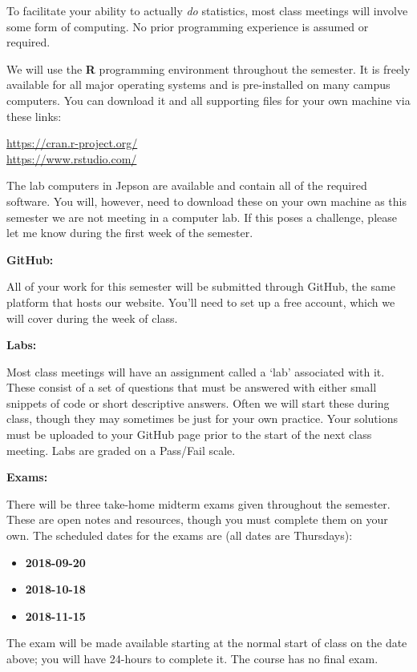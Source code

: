 \documentclass[12pt]{article}
\begin{document}
To facilitate your ability to actually \textit{do} statistics,
most class meetings will involve some form of computing.
No prior programming experience is assumed or required.

\medskip

We will use the \textbf{R} programming environment throughout the
semester. It is freely available for all major operating systems and
is pre-installed on many campus computers. You can download it and
all supporting files for your own machine via these links:
\begin{center}
\url{https://cran.r-project.org/} \\
\url{https://www.rstudio.com/}
\end{center}
The lab computers in Jepson are available and contain all of the
required software. You will, however, need to download these on your own
machine as this semester we are not meeting in a computer lab. If this poses
a challenge, please let me know during the first week of the semester.

\bigskip

\textbf{GitHub:} \vspace{6pt}

All of your work for this semester will be submitted through GitHub,
the same platform that hosts our website. You'll need to set up a free
account, which we will cover during the week of class.

\bigskip

\textbf{Labs:} \vspace{6pt}

Most class meetings will have an assignment called a `lab' associated with it.
These consist of a set of questions that must be answered with either small
snippets of code or short descriptive answers. Often we will start these during
class, though they may sometimes be just for your own practice. Your solutions
must be uploaded to your GitHub page prior to the start of the next class
meeting. Labs are graded on a Pass/Fail scale.

\bigskip

\textbf{Exams:} \vspace{6pt}

There will be three take-home midterm exams given throughout the semester.
These are open notes and resources, though you must complete them on your
own. The scheduled dates for the exams are (all dates are Thursdays):
\begin{itemize}\setlength\itemsep{0em}
\item \textbf{2018-09-20}
\item \textbf{2018-10-18}
\item \textbf{2018-11-15}
\end{itemize}
The exam will be made available starting at the normal start of class on the
date above; you will have 24-hours to complete it. The course has no final
exam.
\end{document}
